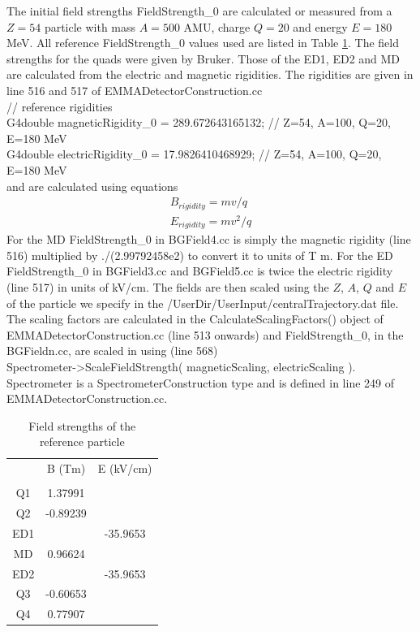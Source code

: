\documentclass[letter,11pt]{article}
\newcommand{\filefont}[1]{{\scriptsize\ttfamily\selectfont #1}\xspace}
\begin{document}
The initial field strengths \filefont{FieldStrength\_0} are calculated or measured from a $Z=54$ particle with mass $A=500$ AMU, charge $Q=20$ and energy $E=180$ MeV. All reference \filefont{FieldStrength\_0} values used are listed in Table \ref{tab:fields}. The field strengths for the quads were given by Bruker. Those of the ED1, ED2 and MD are calculated from the electric and magnetic rigidities. The rigidities are given in line 516 and 517 of EMMADetectorConstruction.cc\\
\filefont{  // reference rigidities\\
  G4double magneticRigidity\_0 = 289.672643165132; // Z=54, A=100, Q=20, E=180 MeV\\
  G4double electricRigidity\_0 = 17.9826410468929; // Z=54, A=100, Q=20, E=180 MeV}\\
and are calculated using equations
\begin{align}
B_{rigidity}=mv/q\\
E_{rigidity}=mv^{2}/q
\end{align}
For the MD \filefont{FieldStrength\_0} in BGField4.cc is simply the magnetic rigidity (line 516) multiplied by \filefont{1./(2.99792458e2)} to convert it to units of T m. For the ED \filefont{FieldStrength\_0} in BGField3.cc and BGField5.cc is twice the electric rigidity (line 517) in units of kV/cm. The fields are then scaled using the $Z$, $A$, $Q$ and $E$ of the particle we specify in the /UserDir/UserInput/centralTrajectory.dat file. The scaling factors are calculated in the CalculateScalingFactors() object of EMMADetectorConstruction.cc (line 513 onwards) and \filefont{FieldStrength\_0}, in the BGFieldn.cc, are scaled in using (line 568)\\
\filefont{Spectrometer->ScaleFieldStrength( magneticScaling, electricScaling )}.\\
\filefont{Spectrometer} is a \filefont{SpectrometerConstruction} type and is defined in line 249 of EMMADetectorConstruction.cc.

\begin{table}
\caption{Field strengths of the reference particle}\label{tab:fields}
\centering
\begin{tabular}{ccc}
\hline
	&B (Tm)	&E (kV/cm)\\\\
\hline
Q1	&1.37991		&\\
Q2	&-0.89239		&\\
ED1	&			&-35.9653\\
MD	&0.96624		&\\
ED2	&			&-35.9653\\
Q3	&-0.60653		&\\
Q4	&0.77907		&\\
\end{tabular}
\end{table}
\end{document}

